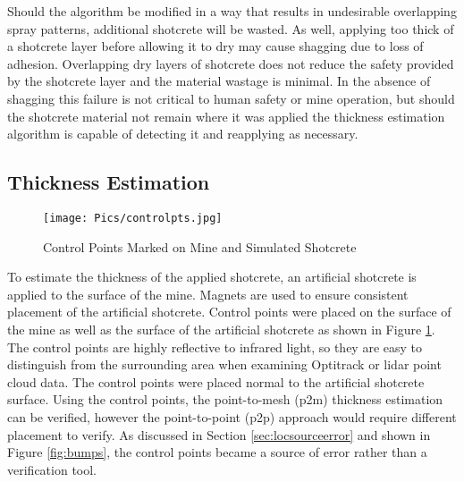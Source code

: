 Should the algorithm be modified in a way that results in undesirable overlapping spray patterns, additional shotcrete will be wasted. As well, applying too thick of a shotcrete layer before allowing it to dry may cause shagging due to loss of adhesion. Overlapping dry layers of shotcrete does not reduce the safety provided by the shotcrete layer and the material wastage is minimal. In the absence of shagging this failure is not critical to human safety or mine operation, but should the shotcrete material not remain where it was applied the thickness estimation algorithm is capable of detecting it and reapplying as necessary.\\

\subsection{Thickness Estimation}

\begin{figure}
    \centering
    \texttt{[image: Pics/controlpts.jpg]}
    \caption{Control Points Marked on Mine and Simulated Shotcrete}
    \label{fig:controlpts}
\end{figure}

To estimate the thickness of the applied shotcrete, an artificial shotcrete is applied to the surface of the mine. Magnets are used to ensure consistent placement of the artificial shotcrete. Control points were placed on the surface of the mine as well as the surface of the artificial shotcrete as shown in Figure \ref{fig:controlpts}. The control points are highly reflective to infrared light, so they are easy to distinguish from the surrounding area when examining Optitrack or \acrshort{lidar} point cloud data. The control points were placed normal to the artificial shotcrete surface. Using the control points, the point-to-mesh (\acrshort{p2m}) thickness estimation can be verified, however the point-to-point (\acrshort{p2p}) approach would require different placement to verify. As discussed in Section \ref{sec:locsourceerror} and shown in Figure \ref{fig:bumps}, the control points became a source of error rather than a verification tool.\\

